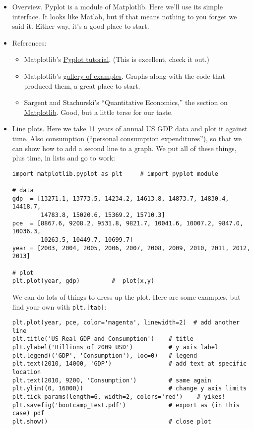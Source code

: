 \documentclass[11pt]{article}
\begin{document}
\begin{itemize}
\item Overview.  Pyplot is a module of Matplotlib.
Here we'll use its simple interface.
It looks like Matlab, but if that means nothing to you forget we said it.
Either way, it's a good place to start.

\item References:
\begin{itemize}
\item Matplotlib's
\href{http://matplotlib.org/users/pyplot_tutorial.html}{Pyplot tutorial}.
(This is excellent, check it out.)
\item Matplotlib's
\href{http://matplotlib.org/gallery.html}{gallery of examples}.
Graphs along with the code that produced them, a great place to start.
\item Sargent and Stachurski's ``Quantitative Economics,''
the section on
\href{http://quant-econ.net/py/matplotlib.html}{Matplotlib}.
Good, but a little terse for our taste.
\end{itemize}

\item Line plots.
Here we take 11 years of annual US GDP data and plot it against time.
Also consumption (``personal consumption expenditures''), so that we can
show how to add a second line to a graph.
We put all of these things, plus time, in lists and go to work:
\begin{verbatim}
import matplotlib.pyplot as plt     # import pyplot module

# data
gdp  = [13271.1, 13773.5, 14234.2, 14613.8, 14873.7, 14830.4, 14418.7,
        14783.8, 15020.6, 15369.2, 15710.3]
pce  = [8867.6, 9208.2, 9531.8, 9821.7, 10041.6, 10007.2, 9847.0, 10036.3,
        10263.5, 10449.7, 10699.7]
year = [2003, 2004, 2005, 2006, 2007, 2008, 2009, 2010, 2011, 2012, 2013]

# plot
plt.plot(year, gdp)         #  plot(x,y)
\end{verbatim}
We can do lots of things to dress up the plot.
Here are some examples, but find your own with {\tt plt.[tab]}:
\begin{verbatim}
plt.plot(year, pce, color='magenta', linewidth=2)  # add another line
plt.title('US Real GDP and Consumption')    # title
plt.ylabel('Billions of 2009 USD')          # y axis label
plt.legend(('GDP', 'Consumption'), loc=0)   # legend
plt.text(2010, 14000, 'GDP')                # add text at specific location
plt.text(2010, 9200, 'Consumption')         # same again
plt.ylim((0, 16000))                        # change y axis limits
plt.tick_params(length=6, width=2, colors='red')    # yikes!
plt.savefig('bootcamp_test.pdf')            # export as (in this case) pdf
plt.show()                                  # close plot
\end{verbatim}


\end{itemize}
\end{document}

